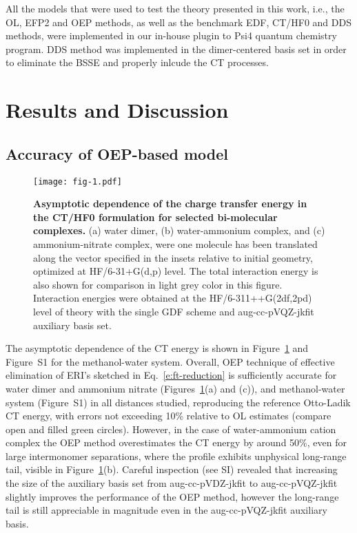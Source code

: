 All the models that were used to test the theory presented in this work,
i.e., the OL, EFP2 and OEP methods, as well as the benchmark EDF, CT/HF0 and DDS methods,
were implemented in our in\hyp{}house plugin to {\sc Psi4} quantum chemistry program.\cite{Psi4.JCTC.2017}
DDS method was implemented in the dimer\hyp{}centered basis set
in order to eliminate the BSSE and properly inlcude the CT processes.\cite{Stone.Misquitta.CPL.2009}


\section{\label{s:5.results}Results and Discussion}

\subsection{\label{ss:5.1.accuracy}Accuracy of OEP-based model}

%
\begin{figure}[h]
\texttt{[image: fig-1.pdf]}
\caption{\label{f:fig-1} {\bf Asymptotic dependence of the charge transfer energy
in the CT/HF0 formulation for selected bi\hyp{}molecular complexes.} 
(a) water dimer, 
(b) water\hyp{}ammonium complex, and 
(c) ammonium\hyp{}nitrate complex,
were one molecule has been translated
along the vector specified in the insets relative to initial geometry,
optimized at HF/6-31+G(d,p) level.
The 
total interaction energy
is also shown for comparison in light grey color in this figure.
Interaction energies were obtained at the HF/6-311++G(2df,2pd) level of theory
with the single GDF scheme and aug-cc-pVQZ-jkfit auxiliary basis set.
} 
\end{figure}
%
The asymptotic dependence of the CT energy
is
shown in Figure~\ref{f:fig-1} and Figure~S1 for the methanol\hyp{}water system. 
Overall, OEP technique of effective
elimination of ERI's sketched in Eq.~\eqref{e:ft-reduction} 
is sufficiently accurate
for water dimer and ammonium nitrate (Figures~\ref{f:fig-1}(a) and (c)),
and methanol\hyp{}water system (Figure~S1) in all distances studied,
reproducing the reference Otto\hyp{}Ladik CT energy, with errors not
exceeding 10\% relative to OL estimates (compare open and filled green circles).
However, in the case of water\hyp{}ammonium cation complex the OEP
method overestimates the CT energy by around 50\%, even for large
intermonomer separations, where the profile exhibits
unphysical long\hyp{}range tail, visible in Figure~\ref{f:fig-1}(b). 
Careful inspection
(see SI)
revealed that increasing the size of the 
auxiliary basis set from aug-cc-pVDZ-jkfit to aug-cc-pVQZ-jkfit
slightly improves the performance of the OEP method, however the long\hyp{}range
tail is still appreciable in magnitude even in the aug-cc-pVQZ-jkfit auxiliary basis.

